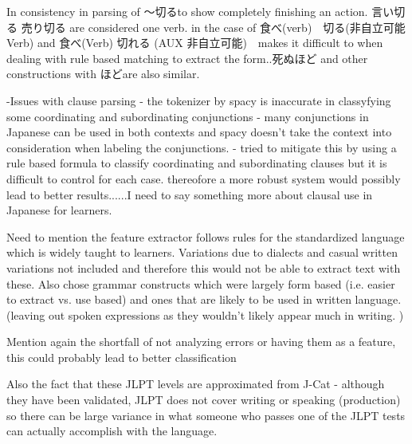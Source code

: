 In consistency in parsing of 〜切るto show completely finishing an action. 言い切る 売り切る are considered one verb. in the
case of 食べ(verb)　切る(非自立可能Verb) and 食べ(Verb) 切れる (AUX 非自立可能)　makes it difficult to when dealing with rule based
matching to extract the form..死ぬほど and other constructions with ほどare also similar.

-Issues with clause parsing - the tokenizer by spacy is inaccurate in classyfying some coordinating and
subordinating conjunctions - many conjunctions in Japanese can be used in both contexts and spacy doesn't take the
context into consideration when labeling the conjunctions. - tried to mitigate this by using a rule based formula to
classify coordinating and subordinating clauses but it is difficult to control for each case. thereofore a more
robust system would possibly lead to better results......I need to say something more about clausal use in Japanese
for learners.


Need to mention the feature extractor follows rules for the standardized language which is widely taught to
learners. Variations due to dialects and casual written variations not included and therefore this would not be
able to extract text with these. Also chose grammar constructs which were largely form based (i.e. easier to extract
vs. use based) and ones that are likely to be used in written language. (leaving out spoken expressions as they
wouldn't likely appear much in writing. )

Mention again the shortfall of not analyzing errors or having them as a feature, this could probably lead to better
classification

Also the fact that these JLPT levels are approximated from J-Cat - although they have been validated, JLPT does not
cover writing or speaking (production) so there can be large variance in what someone who passes one of the JLPT
tests can actually accomplish with the language.